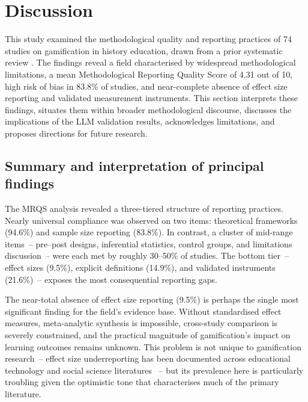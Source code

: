 \documentclass[etq]{acnsart}
\begin{document}
	
	
	\section{Discussion}
	\label{sec:discussion}
	
	This study examined the methodological quality and reporting practices of 74 studies on gamification in history education, drawn from a prior systematic review \cite{KorniienkoSemerikov2024}. The findings reveal a field characterised by widespread methodological limitations, a mean Methodological Reporting Quality Score of 4.31 out of 10, high risk of bias in 83.8\% of studies, and near-complete absence of effect size reporting and validated measurement instruments. This section interprets these findings, situates them within broader methodological discourse, discusses the implications of the LLM validation results, acknowledges limitations, and proposes directions for future research.
	
	\subsection{Summary and interpretation of principal findings}
	\label{sec:discussion_summary}
	
	The MRQS analysis revealed a three-tiered structure of reporting practices. Nearly universal compliance was observed on two items: theoretical frameworks (94.6\%) and sample size reporting (83.8\%). In contrast, a cluster of mid-range items~-- pre--post designs, inferential statistics, control groups, and limitations discussion~-- were each met by roughly 30--50\% of studies. The bottom tier~-- effect sizes (9.5\%), explicit definitions (14.9\%), and validated instruments (21.6\%)~-- exposes the most consequential reporting gaps.
	
	The near-total absence of effect size reporting (9.5\%) is perhaps the single most significant finding for the field's evidence base. Without standardised effect measures, meta-analytic synthesis is impossible, cross-study comparison is severely constrained, and the practical magnitude of gamification's impact on learning outcomes remains unknown. This problem is not unique to gamification research~-- effect size underreporting has been documented across educational technology and social science literatures \cite{Clark2016}~-- but its prevalence here is particularly troubling given the optimistic tone that characterises much of the primary literature.
	
\end{document}
